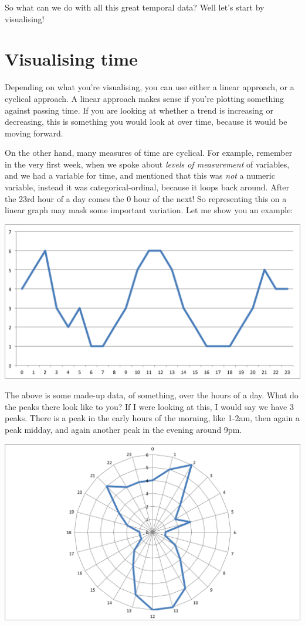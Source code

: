 \documentclass[
]{book}
\begin{document}
So what can we do with all this great temporal data? Well let's start by visualising!

\hypertarget{visualising-time}{%
\section{Visualising time}\label{visualising-time}}

Depending on what you're visualising, you can use either a linear approach, or a cyclical approach. A linear approach makes sense if you're plotting something against passing time. If you are looking at whether a trend is increasing or decreasing, this is something you would look at over time, because it would be moving forward.

On the other hand, many measures of time are cyclical. For example, remember in the very first week, when we spoke about \emph{levels of measurement} of variables, and we had a variable for time, and mentioned that this was \emph{not} a numeric variable, instead it was categorical-ordinal, because it loops back around. After the 23rd hour of a day comes the 0 hour of the next! So representing this on a linear graph may mask some important variation. Let me show you an example:

\includegraphics{imgs/time_line_ex.png}

The above is some made-up data, of something, over the hours of a day. What do the peaks there look like to you? If I were looking at this, I would say we have 3 peaks. There is a peak in the early hours of the morning, like 1-2am, then again a peak midday, and again another peak in the evening around 9pm.

\includegraphics{imgs/time_radar_ex.png}
\end{document}
